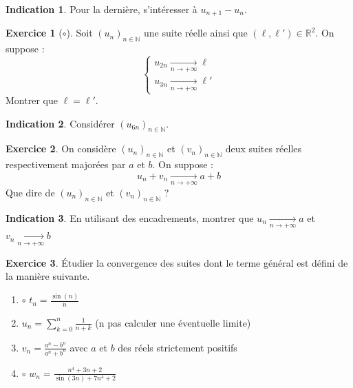 \documentclass[french]{book}
\newcommand{\N}{\mathbb{N}}
\newcommand{\R}{\mathbb{R}}
\theoremstyle{definition}
\newtheorem{ex}{Exercice}[chapter]
\theoremstyle{theorem}
\newtheorem*{ind}{Indication}
\theoremstyle{remark}
\begin{document}
\begin{ind}
	Pour la dernière, s'intéresser à $u_{n+1}-u_n$.
\end{ind}

\begin{ex}[$\circ$]
	Soit $(u_n)_{n\in\N}$ une suite réelle ainsi que $(\ell,\ell')\in\R^2$. On suppose : $$\begin{cases}
		u_{2n}\xrightarrow[n\to+\infty]{}\ell \\
		u_{3n}\xrightarrow[n\to+\infty]{}\ell'
	\end{cases}$$
	Montrer que $\ell=\ell'$.
\end{ex}

\begin{ind}
	Considérer $(u_{6n})_{n\in\N}$.
\end{ind}

\begin{ex}
	On considère $(u_n)_{n\in\N}$ et $(v_n)_{n\in\N}$ deux suites réelles respectivement majorées par $a$ et $b$. On suppose : $$u_n+v_n\xrightarrow[n\to+\infty]{}a+b$$ Que dire de $(u_n)_{n\in\N}$ et $(v_n)_{n\in\N}$ ?
\end{ex}

\begin{ind}
	En utilisant des encadrements, montrer que $u_n\xrightarrow[n\to+\infty]{}a$ et $v_n\xrightarrow[n\to+\infty]{}b$ 
\end{ind}

\begin{ex}
	Étudier la convergence des suites dont le terme général est défini de la manière suivante.
	\begin{enumerate}
		\item $\circ$ $t_n=\displaystyle\frac{\sin(n)}{n}$
		\item $u_n=\displaystyle\sum_{k=0}^{n}\frac{1}{n+k}$ (n pas calculer une éventuelle limite)
		\item $v_n=\displaystyle\frac{a^n-b^n}{a^n+b^n}$ avec $a$ et $b$ des réels strictement positifs
		\item $\circ$ $w_n=\displaystyle\frac{n^4+3n+2}{\sin(3n)+7n^4+2}$
	\end{enumerate}
\end{ex}
\end{document}
